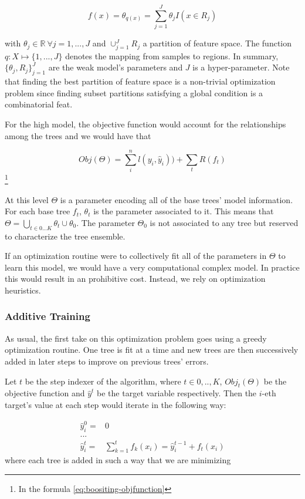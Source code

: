 \[
f(x) = \theta_{q(x)} = \sum_{j=1}^J \theta_j I(x \in  R_j)
\]

with $\theta_j \in \mathbb{R} \ \forall j = 1,...,J$ and $ \cup_{j=1}^J R_j$ a partition of feature space. The function $q : X \mapsto \{1,...,J\}$ denotes the mapping from samples to regions. In summary, $\{\theta_j, R_j\}_{j=1}^J$ are the weak model's parameters and $J$ is a hyper-parameter. Note that finding the best partition of feature space is a non-trivial optimization problem since finding subset partitions satisfying a global condition is a combinatorial feat.

For the high model, the objective function would account for the relationships among the trees and we would have that

\[ Obj(\Theta) = \sum_i^n l(y_i,\hat{y}_i))  +  \sum_t R(f_t) \] \label{eq:boositing-objfunction} \footnote{In the formula \ref{eq:boositing-objfunction} }
%

At this level $\Theta$ is a parameter encoding all of the base trees' model information. For each base tree $f_t$, $\theta_t$ is the parameter associated to it. This means that $\Theta =  \bigcup_{t \in {0...K}} \theta_t  \cup \theta_0$.  The parameter $\Theta_0$ is not associated to any tree but reserved to characterize the tree ensemble.

If an optimization routine were to collectively fit all of the parameters in $\Theta$ to learn this model, we would have a very computational complex model. In practice this would result in an prohibitive cost. Instead, we rely on optimization heuristics.

\subsubsection{Additive Training}

As usual, the first take on this optimization problem goes using a greedy optimization routine. One tree is fit at a time and new trees are then successively added in later steps to improve on previous trees' errors.

Let $t$ be the step indexer of the algorithm, where $t \in {0,..,K}$, $Obj_t(\Theta)$ be the objective function and $\hat{y}^t$ be the target variable respectively. Then the $i$-eth target's value at each step would iterate in the following way:

\begin{equation} \label{eq:gb-targetSteps}
\begin{split}
\hat{y}_i^0 = & 0 \\
... \\
\hat{y}_i^t = &\sum_{k=1}^{t} f_k(x_i) = \hat{y}^{t-1}_i +  f_t(x_i)
\end{split}
\end{equation}
where each tree is added in such a way that we are minimizing

